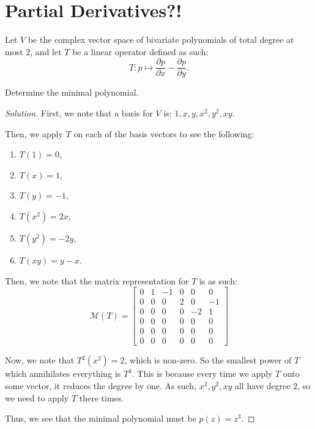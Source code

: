 \documentclass{article}
\newenvironment{solution}{\begin{proof}[Solution]}{\end{proof}}
\begin{document}
	\section{Partial Derivatives?!}
	\begin{hw}
		Let $V$ be the complex vector space of bivariate polynomials of total degree at most $2$, and let $T$ be a linear operator defined as such:
		\begin{equation*}
			T : p \mapsto \frac{\partial p}{\partial x} - \frac{\partial p}{\partial y}.
		\end{equation*}
	
		Determine the minimal polynomial.
	\end{hw}
	\begin{solution}
		First, we note that a basis for $V$ is: $1, x, y, x^{2}, y^{2}, xy$.
		
		Then, we apply $T$ on each of the basis vectors to see the following:
		\begin{enumerate}
			\item $T(1) = 0$,
			\item $T(x) = 1$,
			\item $T(y) = -1$,
			\item $T(x^{2}) = 2x$,
			\item $T(y^{2}) = -2y$,
			\item $T(xy) = y - x$.
		\end{enumerate}
		
		Then, we note that the matrix representation for $T$ is as such:
		\begin{equation*}
			\mathcal{M}(T) =
			\begin{bmatrix}
				0 & 1 & -1 & 0 & 0 & 0 \\
				0 & 0 & 0 & 2 & 0 & -1 \\
				0 & 0 & 0 & 0 & -2 & 1 \\
				0 & 0 & 0 & 0 & 0 & 0 \\
				0 & 0 & 0 & 0 & 0 & 0 \\
				0 & 0 & 0 & 0 & 0 & 0
			\end{bmatrix}
		\end{equation*}
	
		Now, we note that $T^{2}(x^{2}) = 2$, which is non-zero. So the smallest power of $T$ which annihilates everything is $T^{3}$. This is because every time we apply $T$ onto some vector, it reduces the degree by one. As such, $x^{2}, y^{2}, xy$ all have degree $2$, so we need to apply $T$ there times. 
		
		Thus, we see that the minimal polynomial must be $p(z) = z^{3}$.
	\end{solution}
\end{document}
